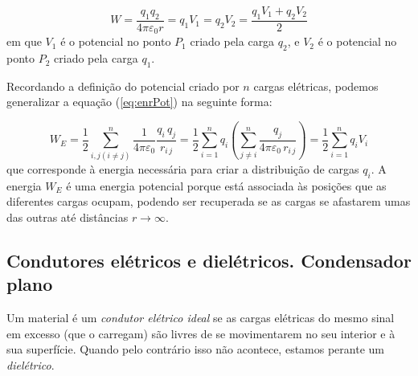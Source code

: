 \documentclass[a4paper,twoside,12pt]{article}      %
\begin{document}
\begin{equation}\label{eq:enrPot}
 W = \frac{q_1 q_2}{4 \pi \varepsilon_0 r} = q_1 V_1 = q_2 V_2 =  \frac{q_1 V_1 +q_2 V_2}{2} 
\end{equation}
em que $V_1$ é o potencial no ponto $P_1$ criado pela carga $q_2$, e $V_2$ é o potencial no ponto $P_2$ criado pela carga $q_1$. 

Recordando a definição do potencial criado por $n$ cargas elétricas, podemos generalizar a equação (\ref{eq:enrPot}) na seguinte forma:

\begin{equation}%
 W_E =  \frac{1}{2} \sum_{i,j (i\ne j)}^n \frac{ 1 }{4 \pi \varepsilon_0} \frac{ q_i \, q_j }{r_{i\,j}}  = 
	 \frac{1}{2} \sum_{i=1}^n q_i \left( \sum_{j \ne i}^n \frac{ q_j }{4 \pi \varepsilon_0 \,r_{i\,j}} \right) =
	\frac{1}{2} \sum_{i=1}^n q_i V_i
\end{equation}
que corresponde à energia necessária para criar a distribuição de cargas $q_i$. A energia $W_E$ é uma energia potencial porque está associada às posições que as diferentes cargas ocupam, podendo ser recuperada se as cargas se afastarem umas das outras até distâncias $r \to \infty$.

\subsection{\sf Condutores elétricos e dielétricos. Condensador plano}
Um material é um \emph{condutor elétrico ideal} se as cargas elétricas do mesmo sinal em excesso (que o carregam) são livres de se movimentarem no seu interior e à sua superfície. Quando pelo contrário isso não acontece, estamos perante um \emph{dielétrico}.
\end{document}

